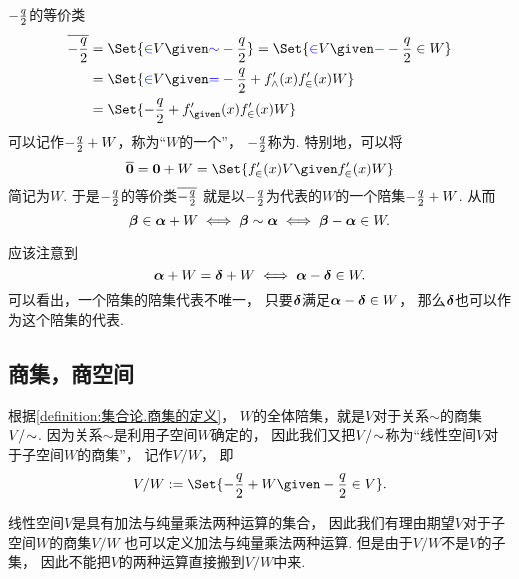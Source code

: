 \(-\frac{q}{2}\)的等价类\begin{align*}
	\overline{\a}
	&=\Set{ \b \in V \given \b \sim \a }
	=\Set{ \b \in V \given \b-\a \in W } \\
	&=\Set{ \b \in V \given \b=\a+\g \land \g \in W } \\
	&=\Set{ \a+\g \given \g \in W }
\end{align*}
可以记作\(-\frac{q}{2}+W\)，称为“\(W\)的一个”，
\(-\frac{q}{2}\)称为.
特别地，可以将\[
	\overline{\vb0}
	= \vb0+W
	= \Set{
		\g \in V
		\given
		\g \in W
	}
\]简记为\(W\).
于是\(-\frac{q}{2}\)的等价类\(\overline{-\frac{q}{2}}\)
就是以\(-\frac{q}{2}\)为代表的\(W\)的一个陪集\(-\frac{q}{2}+W\).
从而\[
	\boldsymbol\beta \in \boldsymbol\alpha + W
	\iff
	\boldsymbol\beta \sim \boldsymbol\alpha
	\iff
	\boldsymbol\beta - \boldsymbol\alpha \in W.
\]

应该注意到\[
	\boldsymbol\alpha + W = \boldsymbol\delta + W
	\iff
	\boldsymbol\alpha - \boldsymbol\delta \in W.
\]
可以看出，一个陪集的陪集代表不唯一，
只要\(\boldsymbol\delta\)满足\(\boldsymbol\alpha-\boldsymbol\delta \in W\)，
那么\(\boldsymbol\delta\)也可以作为这个陪集的代表.

\subsection{商集，商空间}
根据\cref{definition:集合论.商集的定义}，
\(W\)的全体陪集，就是\(V\)对于关系\(\sim\)的商集\(V/\kern-2pt\sim\).
因为关系\(\sim\)是利用子空间\(W\)确定的，
因此我们又把\(V/\kern-2pt\sim\)称为“线性空间\(V\)对于子空间\(W\)的商集”，
记作\(V/W\)，
即\[
	V/W
	\defeq
	\Set{ \a+W \given \a \in V }.
\]

线性空间\(V\)是具有加法与纯量乘法两种运算的集合，
因此我们有理由期望\(V\)对于子空间\(W\)的商集\(V/W\)
也可以定义加法与纯量乘法两种运算.
但是由于\(V/W\)不是\(V\)的子集，
因此不能把\(V\)的两种运算直接搬到\(V/W\)中来.

